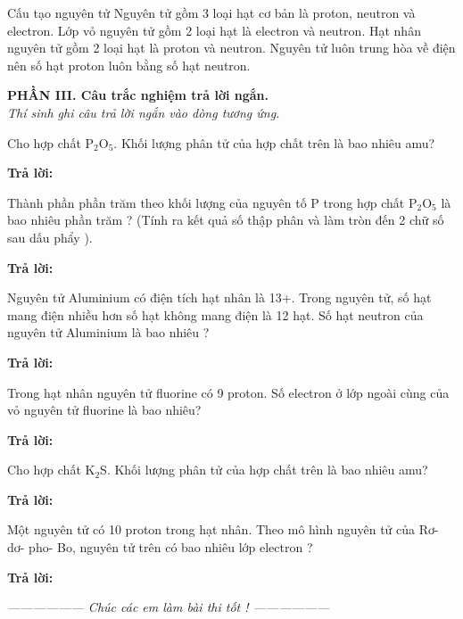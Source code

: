 \documentclass[11pt,a4paper]{article}
\begin{document}
\begin{ex}
Cấu tạo nguyên tử
\choiceTF
{\True Nguyên tử gồm 3 loại hạt cơ bản là proton, neutron và electron.}
{Lớp vỏ nguyên tử gồm 2 loại hạt là electron và neutron.}
{\True Hạt nhân nguyên tử gồm 2 loại hạt là proton và neutron.}
{Nguyên tử luôn trung hòa về điện nên số hạt proton luôn bằng số hạt neutron.}
\end{ex}


\vspace{4pt}
\noindent
\textbf{\color{mainGreen}PHẦN III. Câu trắc nghiệm trả lời ngắn.}\\
\textit{Thí sinh ghi câu trả lời ngắn vào dòng tương ứng.}

\setcounter{ex}{0}

\begin{ex}
Cho hợp chất P$_{2}$O$_{5}$. Khối lượng phân tử của hợp chất trên là bao nhiêu amu?
\par\textbf{Trả lời:} \dotfill
\end{ex}

\begin{ex}
Thành phần phần trăm theo khối lượng của nguyên tố P trong hợp chất P$_{2}$O$_{5}$ là bao nhiêu phần trăm ? (Tính ra kết quả số thập phân và làm tròn đến 2 chữ số sau dấu phẩy ).
\par\textbf{Trả lời:} \dotfill
\end{ex}

\begin{ex}
Nguyên tử Aluminium có điện tích hạt nhân là 13+. Trong nguyên tử, số hạt mang điện nhiều hơn số hạt không mang điện là 12 hạt. Số hạt neutron của nguyên tử Aluminium là bao nhiêu ?
\par\textbf{Trả lời:} \dotfill
\end{ex}

\begin{ex}
Trong hạt nhân nguyên tử fluorine có 9 proton. Số electron ở lớp ngoài cùng của vỏ nguyên tử fluorine là bao nhiêu?
\par\textbf{Trả lời:} \dotfill
\end{ex}

\begin{ex}
Cho hợp chất K$_{2}$S. Khối lượng phân tử của hợp chất trên là bao nhiêu amu?
\par\textbf{Trả lời:} \dotfill
\end{ex}

\begin{ex}
Một nguyên tử có 10 proton trong hạt nhân. Theo mô hình nguyên tử của Rơ- dơ- pho- Bo, nguyên tử trên có bao nhiêu lớp electron ?
\par\textbf{Trả lời:} \dotfill
\end{ex}


\vspace{8pt}
\begin{center}
\textit{------------------ Chúc các em làm bài thi tốt ! ------------------}
\end{center}
\end{document}
